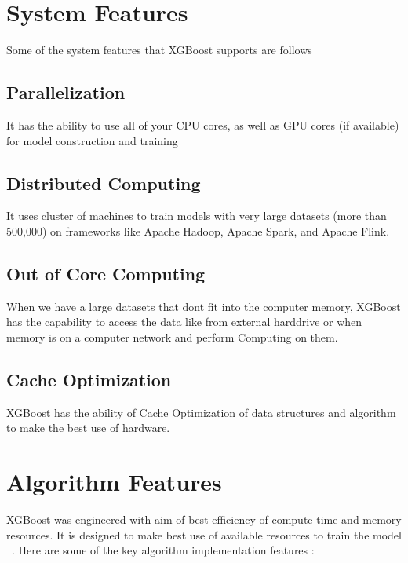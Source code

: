 \section{System Features} 

Some of the system features that XGBoost supports are follows 

\subsection{Parallelization}

It has the ability to use all of your CPU cores, as well as GPU cores (if
available) for model construction and training

\subsection{Distributed Computing}

It uses cluster of machines to train models with very large datasets (more than
500,000) on frameworks like Apache Hadoop, Apache Spark, and Apache Flink.

\subsection{Out of Core Computing}

When we have a large datasets that dont fit into the computer memory, XGBoost
has the capability to access the data  like from external harddrive or when
memory is on a computer network and perform Computing on them.

\subsection{Cache Optimization}

XGBoost has the ability of Cache Optimization of data structures and algorithm
to make the best use of hardware.



\section{Algorithm Features} 

XGBoost was engineered with aim of best efficiency of compute time and memory
resources. It is designed to make best use of available resources to train the
model ~\cite{hid-sp18-401-XGBoost-MLmastery}. Here are some of the key algorithm
implementation features :

